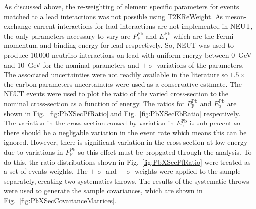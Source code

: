 As discussed above, the re-weighting of element specific parameters for events matched to a lead interactions was not possible using T2KReWeight.  As meson-exchange current interactions for lead interactions are not implemented in NEUT, the only parameters necessary to vary are $P_{\textrm{F}}^{\textrm{Pb}}$ and $E_{\textrm{b}}^{\textrm{Pb}}$ which are the Fermi-momentum and binding energy for lead respectively.  So, NEUT was used to produce 10,000 neutrino interactions on lead with uniform energy between 0~GeV and 10~GeV for the nominal parameters and $\pm\upsigma$ variations of the parameters.  The associated uncertainties were not readily available in the literature so $1.5\times$ the carbon parameters uncertainties were used as a conservative estimate.  The NEUT events were used to plot the ratio of the varied cross-section to the nominal cross-section as a function of energy.  The ratios for $P_{\textrm{F}}^{\textrm{Pb}}$ and $E_{\textrm{b}}^{\textrm{Pb}}$ are shown in Fig.~\ref{fig:PbXSecPfRatio} and Fig.~\ref{fig:PbXSecEbRatio} respectively.  The variation in the cross-section caused by variation in $E_{\textrm{b}}^{\textrm{Pb}}$ is sub-percent so there should be a negligable variation in the event rate which means this can be ignored.  However, there is significant variation in the cross-section at low energy due to variations in $P_{\textrm{F}}^{\textrm{Pb}}$ so this effect must be propgated through the analysis.  To do this, the ratio distributions shown in Fig.~\ref{fig:PbXSecPfRatio} were treated as a set of events weights.  The $+\upsigma$ and $-\upsigma$ weights were applied to the sample separately, creating two systematics throws.  The results of the systematic throws were used to generate the sample covariances, which are shown in Fig.~\ref{fig:PbXSecCovarianceMatrices}.
